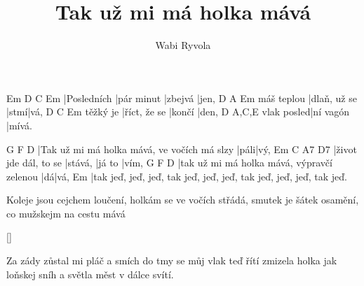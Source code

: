 \documentclass{song}
\author{Wabi Ryvola}
\title{Tak už mi má holka mává}
\begin{document}
\strophe
Em          D          C       Em
|Posledních |pár minut |zbejvá |jen,
           D            A    Em
máš teplou |dlaň, už se |stmí|vá,
         D            C      Em
těžký je |říct, že se |končí |den,
           D         A,C,E
vlak posled|ní vagón |mívá.
\endstrophe

G                                           F    D
|Tak už mi má holka mává, ve vočích má slzy |páli|vý,
Em                    C       A7     D7
|život jde dál, to se |stává, |já to |vím,
G                                          F  D
|tak už mi má holka mává, výpravčí zelenou |dá|vá,
Em
|tak jeď, jeď, jeď, tak jeď, jeď, jeď, tak jeď, jeď, jeď, tak jeď.
\endstrophe

\strophe*
Koleje jsou cejchem loučení,
holkám se ve vočích střádá,
smutek je šátek osamění,
co mužskejm na cestu mává
\endstrophe

\ref{}

\strophe*
Za zády zůstal mi pláč a smích
do tmy se můj vlak teď řítí
zmizela holka jak loňskej sníh
a světla měst v dálce svítí.
\endstrophe
\end{document}
